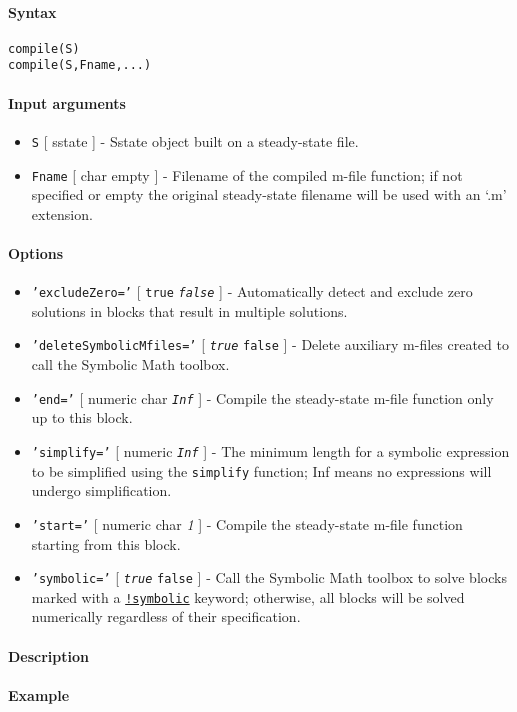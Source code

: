 


	\paragraph{Syntax}

\begin{verbatim}
compile(S)
compile(S,Fname,...)
\end{verbatim}

\paragraph{Input arguments}

\begin{itemize}
\item
  \texttt{S} {[} sstate {]} - Sstate object built on a steady-state
  file.
\item
  \texttt{Fname} {[} char \textbar{} empty {]} - Filename of the
  compiled m-file function; if not specified or empty the original
  steady-state filename will be used with an `.m' extension.
\end{itemize}

\paragraph{Options}

\begin{itemize}
\item
  \texttt{'excludeZero='} {[} \texttt{true} \textbar{}
  \emph{\texttt{false}} {]} - Automatically detect and exclude zero
  solutions in blocks that result in multiple solutions.
\item
  \texttt{'deleteSymbolicMfiles='} {[} \emph{\texttt{true}} \textbar{}
  \texttt{false} {]} - Delete auxiliary m-files created to call the
  Symbolic Math toolbox.
\item
  \texttt{'end='} {[} numeric \textbar{} char \textbar{}
  \emph{\texttt{Inf}} {]} - Compile the steady-state m-file function
  only up to this block.
\item
  \texttt{'simplify='} {[} numeric \textbar{} \emph{\texttt{Inf}} {]} -
  The minimum length for a symbolic expression to be simplified using
  the \texttt{simplify} function; Inf means no expressions will undergo
  simplification.
\item
  \texttt{'start='} {[} numeric \textbar{} char \textbar{} \emph{1} {]}
  - Compile the steady-state m-file function starting from this block.
\item
  \texttt{'symbolic='} {[} \emph{\texttt{true}} \textbar{}
  \texttt{false} {]} - Call the Symbolic Math toolbox to solve blocks
  marked with a \href{sstatelang/symbolic}{\texttt{!symbolic}} keyword;
  otherwise, all blocks will be solved numerically regardless of their
  specification.
\end{itemize}

\paragraph{Description}

\paragraph{Example}


